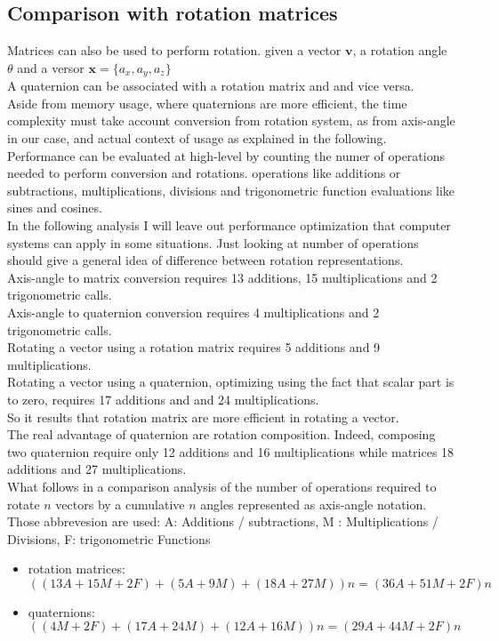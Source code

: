 \subsection{Comparison with rotation matrices}
Matrices can also be used to perform rotation. \cite{Eberly2016RotationRA} given a vector $\boldsymbol{v}$, a rotation angle $\theta$ and a versor $\boldsymbol{x}=\{a_x, a_y, a_z\}$  \\
A quaternion can be associated with a rotation matrix and and vice versa. \cite{amslaurea6701,Eberly2016RotationRA} \\
Aside from memory usage, where quaternions are more efficient, the time complexity must take account conversion from rotation system, as from axis-angle in our case, and actual context of usage as explained in the following.  \\
Performance can be evaluated at high-level by counting the numer of operations needed to perform conversion and rotations. operations like additions or subtractions, multiplications, divisions and trigonometric function evaluations like sines and cosines. \\
In the following analysis I will leave out performance optimization that computer systems can apply in some situations. Just looking at number of operations should give a general idea of difference between rotation representations. \\
Axis-angle to matrix conversion requires 13 additions, 15 multiplications and 2 trigonometric calls. \\
Axis-angle to quaternion conversion requires 4 multiplications and 2 trigonometric calls. \\
Rotating a vector using a rotation matrix requires 5 additions and 9 multiplications. \\
Rotating a vector using a quaternion, optimizing using the fact that scalar part is to zero, requires 17 additions and and 24 multiplications. \\
So it results that rotation matrix are more efficient in rotating a vector. \\
The real advantage of quaternion are rotation composition. 
Indeed, composing two quaternion require only 12 additions and 16 multiplications while matrices 18 additions and 27 multiplications. \\
What follows in a comparison analysis of the number of operations required to rotate $n$ vectors by a cumulative $n$ angles represented as axis-angle notation.
Those abbrevesion are used: A: Additions / subtractions, M : Multiplications / Divisions, F: trigonometric Functions
\begin{itemize}
\item rotation matrices: ${((13A + 15M + 2F) + (5A + 9M) + (18A + 27M))n} = {(36A + 51M + 2F)n}$
\item quaternions: ${((4M + 2F) + (17A + 24M) + (12A + 16M))n} = {(29A + 44M + 2F)n}$
\end{itemize}

